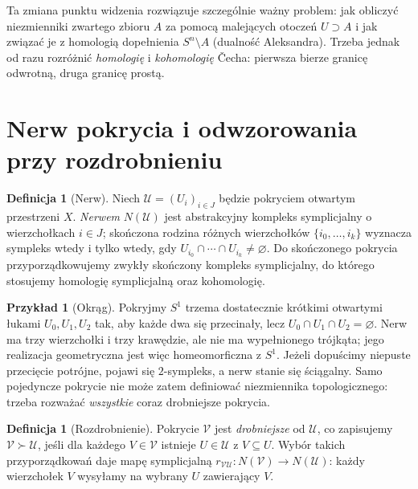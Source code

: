 \documentclass[11pt,a4paper,oneside]{report}
\theoremstyle{plain}
\theoremstyle{definition}
\newtheorem{definicja}[twierdzenie]{Definicja}
\newtheorem{przyklad}[twierdzenie]{Przykład}
\theoremstyle{remark}
\begin{document}
Ta zmiana punktu widzenia rozwiązuje szczególnie ważny problem:
jak obliczyć niezmienniki zwartego zbioru $A$ za pomocą malejących
otoczeń $U\supset A$ i jak związać je z homologią dopełnienia
$S^n\setminus A$ (dualność Aleksandra). Trzeba jednak od razu
rozróżnić \emph{homologię} i \emph{kohomologię} \v{C}echa:
pierwsza bierze granicę odwrotną, druga granicę prostą.

\section{Nerw pokrycia i odwzorowania przy rozdrobnieniu}
\begin{definicja}[Nerw]
Niech $\mathcal U=(U_i)_{i\in J}$ będzie pokryciem otwartym
przestrzeni $X$. \emph{Nerwem} $N(\mathcal U)$ jest abstrakcyjny
kompleks symplicjalny o wierzchołkach $i\in J$; skończona rodzina
różnych wierzchołków $\{i_0,\ldots,i_k\}$ wyznacza sympleks
wtedy i tylko wtedy, gdy $U_{i_0}\cap\cdots\cap U_{i_k}\ne\varnothing$.
Do skończonego pokrycia przyporządkowujemy zwykły skończony
kompleks symplicjalny, do którego stosujemy homologię
symplicjalną oraz kohomologię.
\end{definicja}

\begin{przyklad}[Okrąg]
Pokryjmy $S^1$ trzema dostatecznie krótkimi otwartymi łukami
$U_0,U_1,U_2$ tak, aby każde dwa się przecinały, lecz
$U_0\cap U_1\cap U_2=\varnothing$.
Nerw ma trzy wierzchołki i trzy krawędzie, ale nie ma
wypełnionego trójkąta; jego realizacja geometryczna jest więc
homeomorficzna z $S^1$.
Jeżeli dopuścimy niepuste przecięcie potrójne, pojawi się
$2$-sympleks, a nerw stanie się ściągalny. Samo pojedyncze
pokrycie nie może zatem definiować niezmiennika topologicznego:
trzeba rozważać \emph{wszystkie} coraz drobniejsze pokrycia.
\end{przyklad}

\begin{definicja}[Rozdrobnienie]
Pokrycie $\mathcal V$ jest \emph{drobniejsze} od $\mathcal U$,
co zapisujemy $\mathcal V\succ\mathcal U$, jeśli dla każdego
$V\in\mathcal V$ istnieje $U\in\mathcal U$ z $V\subseteq U$.
Wybór takich przyporządkowań daje mapę symplicjalną
$r_{\mathcal V\mathcal U}:N(\mathcal V)\to N(\mathcal U)$:
każdy wierzchołek $V$ wysyłamy na wybrany $U$ zawierający $V$.
\end{definicja}
\end{document}
